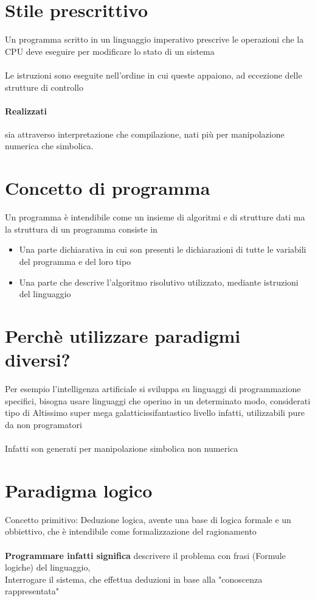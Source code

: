 \documentclass[12pt, a4paper, openany, oneside]{book}
\begin{document}
\section{Stile prescrittivo}
Un programma scritto in un linguaggio imperativo prescrive le operazioni che
la CPU deve eseguire per modificare lo stato di un sistema \\ \\
Le istruzioni sono eseguite nell'ordine in cui queste appaiono, ad eccezione
delle strutture di controllo
\paragraph{Realizzati} sia attraverso interpretazione che compilazione, nati
più per manipolazione numerica che simbolica.
\\
\section{Concetto di programma}
Un programma è intendibile come un insieme di algoritmi e di strutture dati
ma la struttura di un programma consiste in
\begin{itemize}
	\item Una parte dichiarativa in cui son presenti le dichiarazioni di tutte
	le variabili del programma e del loro tipo
	\item Una parte che descrive l'algoritmo risolutivo utilizzato, mediante 
	istruzioni del linguaggio	
\end{itemize}
\section{Perchè utilizzare paradigmi diversi?}
Per esempio l'intelligenza artificiale si sviluppa su linguaggi di 
programmazione specifici, bisogna usare linguaggi che operino in un 
determinato modo, considerati tipo di Altissimo super mega galatticissifantastico 
livello infatti, utilizzabili pure da non programatori
\\ \\
Infatti son generati per manipolazione simbolica non numerica 
\section{Paradigma logico}
Concetto primitivo: Deduzione logica, avente una base di logica formale e un 
obbiettivo, che è intendibile come formalizzazione del ragionamento
\\ \\
\textbf{Programmare infatti significa} descrivere il problema con frasi 
(Formule logiche) del linguaggio, \\
Interrogare il sistema, che effettua deduzioni in base alla "conoscenza 
rappresentata" 
\end{document}
